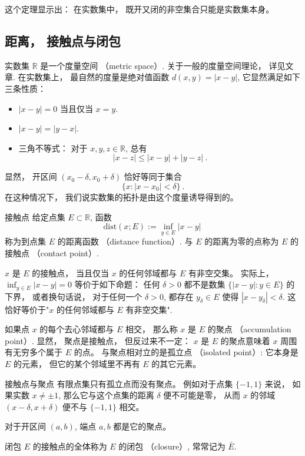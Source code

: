这个定理显示出： 在实数集中， 既开又闭的非空集合只能是实数集本身。

\subsection{距离， 接触点与闭包}
实数集 $\mathbb{R}$ 是一个度量空间 （metric space）. 关于一般的度量空间理论， 详见文章. 在实数集上， 最自然的度量是绝对值函数 $d(x,y)=|x-y|$, 它显然满足如下三条性质：

\begin{itemize}
\item $|x-y|=0$ 当且仅当 $x=y$.
\item $|x-y|=|y-x|$.
\item 三角不等式： 对于 $x,y,z\in\mathbb{R}$, 总有
$$
|x-z|\leq|x-y|+|y-z|~.
$$
\end{itemize}

显然， 开区间 $(x_0-\delta,x_0+\delta)$ 恰好等同于集合
$$
\{x:|x-x_0|<\delta\}~.
$$
在这种情况下， 我们说实数集的拓扑是由这个度量诱导得到的。

\begin{definition}{接触点}
给定点集 $E\subset\mathbb{R}$, 函数
$$
\text{dist}(x;E):=\inf_{y\in E}|x-y|~
$$
称为到点集 $E$ 的距离函数 （distance function）. 与 $E$ 的距离为零的点称为 $E$ 的接触点 （contact point）. 
\end{definition}
$x$ 是 $E$ 的接触点， 当且仅当 $x$ 的任何邻域都与 $E$ 有非空交集。 实际上， $\inf_{y\in E}|x-y|=0$ 等价于如下命题： 任何 $\delta>0$ 都不是数集 $\{|x-y|:y\in E\}$ 的下界， 或者换句话说， 对于任何一个 $\delta>0$, 都存在 $y_\delta\in E$ 使得 $|x-y_\delta|<\delta$. 这恰好等价于"$x$ 的任何邻域都与 $E$ 有非空交集".

如果点 $x$ 的每个去心邻域都与 $E$ 相交， 那么称 $x$ 是 $E$ 的聚点 （accumulation point）. 显然， 聚点是接触点， 但反过来不一定： $x$ 是 $E$ 的聚点意味着 $x$ 周围有无穷多个属于 $E$ 的点。 与聚点相对立的是孤立点 （isolated point）: 它本身是 $E$ 的元素， 但它的某个邻域里不再有 $E$ 的其它元素。

\begin{example}{接触点与聚点}
有限点集只有孤立点而没有聚点。 例如对于点集 $\{-1,1\}$ 来说， 如果实数 $x\neq\pm1$, 那么它与这个点集的距离 $\delta$ 便不可能是零， 从而 $x$ 的邻域 $(x-\delta,x+\delta)$ 便不与 $\{-1,1\}$ 相交。

对于开区间 $(a,b)$, 端点 $a,b$ 都是它的聚点。
\end{example}

\begin{definition}{闭包}
$E$ 的接触点的全体称为 $E$ 的闭包 （closure）, 常常记为 $\bar E$.
\end{definition}

